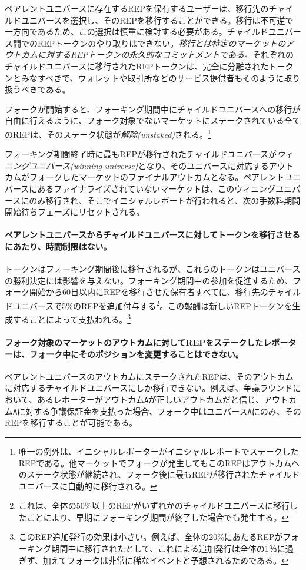 \documentclass[floatfix,reprint,nofootinbib,amsmath,amssymb,epsfig,pre,floats,letterpaper,groupedaffiliation]{revtex4-1}
\theoremstyle{definition}
\theoremstyle{definition}
\theoremstyle{definition}
\begin{document}
ペアレントユニバースに存在するREPを保有するユーザーは、移行先のチャイルドユニバースを選択し、そのREPを移行することができる。移行は不可逆で一方向であるため、この選択は慎重に検討する必要がある。チャイルドユニバース間でのREPトークンのやり取りはできない。\textit{移行とは特定のマーケットのアウトカムに対するREPトークンの永久的なコミットメントである。}それぞれのチャイルドユニバースに移行されたREPトークンは、完全に分離されたトークンとみなすべきで、ウォレットや取引所などのサービス提供者もそのように取り扱うべきである。

フォークが開始すると、フォーキング期間中にチャイルドユニバースへの移行が自由に行えるように、フォーク対象でないマーケットにステークされている全てのREPは、そのステーク状態が\textit{解除(unstaked)}される。\footnote{唯一の例外は、イニシャルレポーターがイニシャルレポートでステークしたREPである。他マーケットでフォークが発生してもこのREPはアウトカムへのステーク状態が継続され、フォーク後に最もREPが移行されたチャイルドユニバースに自動的に移行される。}

フォーキング期間終了時に最もREPが移行されたチャイルドユニバースが\textit{ウィニングユニバース(winning universe)}となり、そのユニバースに対応するアウトカムがフォークしたマーケットのファイナルアウトカムとなる。ペアレントユニバースにあるファイナライズされていないマーケットは、このウィニングユニバースにのみ移行され、そこでイニシャルレポートが行われると、次の手数料期間開始待ちフェーズにリセットされる。

\paragraph*{ペアレントユニバースからチャイルドユニバースに対してトークンを移行させるにあたり、時間制限はない。}トークンはフォーキング期間後に移行されるが、これらのトークンはユニバースの勝利決定には影響を与えない。フォーキング期間中の参加を促進するため、フォーク開始から60日以内にREPを移行させた保有者すべてに、移行先のチャイルドユニバースで5\%のREPを追加付与する\footnote{これは、全体の50\%以上のREPがいずれかのチャイルドユニバースに移行したことにより、早期にフォーキング期間が終了した場合でも発生する。}。この報酬は新しいREPトークンを生成することによって支払われる。\footnote{このREP追加発行の効果は小さい。例えば、全体の20\%にあたるREPがフォーキング期間中に移行されたとして、これによる追加発行は全体の1％に過ぎず、加えてフォークは非常に稀なイベントと予想されるためである。}

\paragraph*{フォーク対象のマーケットのアウトカムに対してREPをステークしたレポーターは、フォーク中にそのポジションを変更することはできない。}ペアレントユニバースのアウトカムにステークされたREPは、そのアウトカムに対応するチャイルドユニバースにしか移行できない。例えば、争議ラウンドにおいて、あるレポーターがアウトカム\texttt{A}が正しいアウトカムだと信じ、アウトカム\texttt{A}に対する争議保証金を支払った場合、フォーク中はユニバース\texttt{A}にのみ、そのREPを移行することが可能である。
\end{document}
